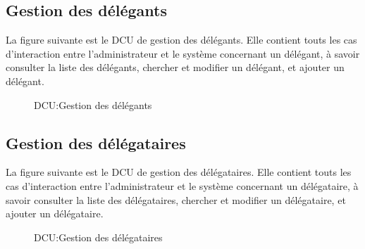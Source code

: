 \documentclass[a4paper]{report}
\begin{document}
\begin{doublespace}
	\subsection{Gestion des délégants}

	La figure suivante est le DCU de gestion des délégants.
	Elle contient touts les cas d'interaction entre l'administrateur et le système concernant un délégant,
	à savoir consulter la liste des délégants, chercher et modifier un délégant, et ajouter un délégant.
	\begin{figure}[H]
		\begin{center}
			\caption{DCU:Gestion des délégants}
		\end{center}
	\end{figure}

	\subsection{Gestion des délégataires}

	La figure suivante est le DCU de gestion des délégataires.
	Elle contient touts les cas d'interaction entre l'administrateur et le système concernant un délégataire,
	à savoir consulter la liste des délégataires, chercher et modifier un délégataire, et ajouter un délégataire.
	\begin{figure}[H]
		\begin{center}
			\caption{DCU:Gestion des délégataires}
		\end{center}
	\end{figure}


\end{doublespace}
\end{document}
